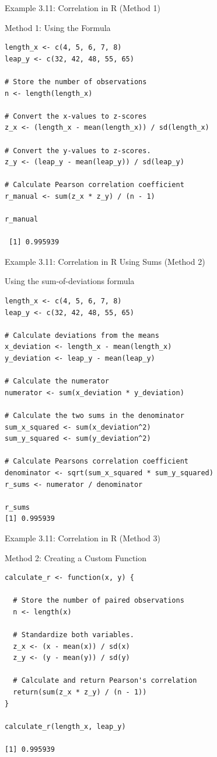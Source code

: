 \documentclass[aspectratio=169]{beamer}
\begin{document}
\begin{frame}[fragile]{Example 3.11: Correlation in R (Method 1)}
\begin{block}{Method 1: Using the Formula}
\scriptsize
\begin{verbatim}
length_x <- c(4, 5, 6, 7, 8)
leap_y <- c(32, 42, 48, 55, 65)

# Store the number of observations
n <- length(length_x)

# Convert the x-values to z-scores
z_x <- (length_x - mean(length_x)) / sd(length_x)

# Convert the y-values to z-scores.
z_y <- (leap_y - mean(leap_y)) / sd(leap_y)

# Calculate Pearson correlation coefficient
r_manual <- sum(z_x * z_y) / (n - 1)

r_manual

 [1] 0.995939
\end{verbatim}
\end{block}
\end{frame}

\begin{frame}[fragile]{Example 3.11: Correlation in R Using Sums (Method 2)}
\begin{block}{Using the sum-of-deviations formula}
\scriptsize
\begin{verbatim}
length_x <- c(4, 5, 6, 7, 8)
leap_y <- c(32, 42, 48, 55, 65)

# Calculate deviations from the means
x_deviation <- length_x - mean(length_x)
y_deviation <- leap_y - mean(leap_y)

# Calculate the numerator
numerator <- sum(x_deviation * y_deviation)

# Calculate the two sums in the denominator
sum_x_squared <- sum(x_deviation^2)
sum_y_squared <- sum(y_deviation^2)

# Calculate Pearsons correlation coefficient
denominator <- sqrt(sum_x_squared * sum_y_squared)
r_sums <- numerator / denominator

r_sums
[1] 0.995939
\end{verbatim}
\end{block}
\end{frame}

\begin{frame}[fragile]{Example 3.11: Correlation in R (Method 3)}
\begin{block}{Method 2: Creating a Custom Function}
\scriptsize
\begin{verbatim}
calculate_r <- function(x, y) {

  # Store the number of paired observations
  n <- length(x)

  # Standardize both variables.
  z_x <- (x - mean(x)) / sd(x)
  z_y <- (y - mean(y)) / sd(y)

  # Calculate and return Pearson's correlation
  return(sum(z_x * z_y) / (n - 1))
}

calculate_r(length_x, leap_y)

[1] 0.995939
\end{verbatim}
\end{block}
\end{frame}
\end{document}
